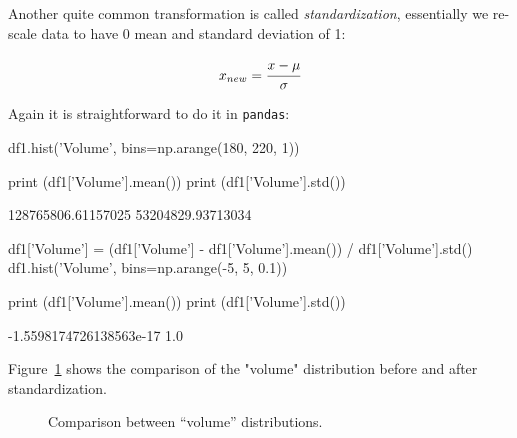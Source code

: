 Another quite common transformation is called \emph{standardization}, essentially we re-scale data to have 0 mean and standard deviation of 1:

\begin{equation}
x_{new} = \cfrac{x-\mu}{\sigma}
\label{eq:standardization}
\end{equation}

Again it is straightforward to do it in \texttt{pandas}:

\begin{ipython}
df1.hist('Volume', bins=np.arange(180, 220, 1))

print (df1['Volume'].mean())
print (df1['Volume'].std())
\end{ipython}
\begin{ioutput}
128765806.61157025
53204829.93713034
\end{ioutput}

\begin{ipython}
df1['Volume'] = (df1['Volume'] - df1['Volume'].mean()) / df1['Volume'].std()
df1.hist('Volume', bins=np.arange(-5, 5, 0.1))

print (df1['Volume'].mean())
print (df1['Volume'].std())
\end{ipython}
\begin{ioutput}
-1.5598174726138563e-17
1.0
\end{ioutput}

Figure~\ref{fig:standardization} shows the comparison of the "volume" distribution before and after standardization.

\begin{figure}[htb]
	\centering
	\caption{Comparison between ``volume'' distributions.}
	\label{fig:standardization}
\end{figure}

